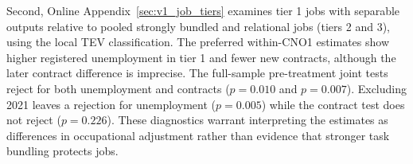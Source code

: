 Second, Online Appendix~\ref{sec:v1_job_tiers} examines tier 1 jobs with separable outputs relative to pooled strongly bundled and relational jobs (tiers 2 and 3), using the local TEV classification. The preferred within-CNO1 estimates show higher registered unemployment in tier 1 and fewer new contracts, although the later contract difference is imprecise. The full-sample pre-treatment joint tests reject for both unemployment and contracts ($p=0.010$ and $p=0.007$). Excluding 2021 leaves a rejection for unemployment ($p=0.005$) while the contract test does not reject ($p=0.226$). These diagnostics warrant interpreting the estimates as differences in occupational adjustment rather than evidence that stronger task bundling protects jobs.
